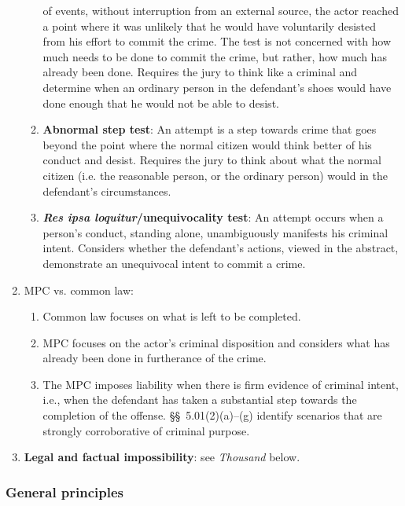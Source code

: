 \begin{enumerate}
\begin{enumerate}
        of events, without interruption from an external source, the actor 
        reached a point where it was unlikely that he would have voluntarily 
        desisted from his effort to commit the crime. The test is not 
        concerned with how much needs to be done to commit the crime, but 
        rather, how much has already been done. Requires the jury to think 
        like a criminal and determine when an ordinary person in the 
        defendant's shoes would have done enough that he would not be able to 
        desist.
        \item \textbf{Abnormal step test}: An attempt is a step towards crime 
        that goes beyond the point where the normal citizen would think better 
        of his conduct and desist.  Requires the jury to think about what the 
        normal citizen (i.e. the reasonable person, or the ordinary person) 
        would in the defendant's circumstances.
        \item \textbf{\emph{Res ipsa loquitur}/unequivocality test}:  An 
        attempt occurs when a person's conduct, standing alone, unambiguously 
        manifests his criminal intent.  Considers whether the defendant's 
        actions, viewed in the abstract, demonstrate an unequivocal intent to 
        commit a crime.
    \end{enumerate}
    \item MPC vs. common law:
    \begin{enumerate}
        \item Common law focuses on what is left to be completed.
        \item MPC focuses on the actor's criminal disposition and considers 
        what has already been done in furtherance of the crime.
        \item The MPC imposes liability when there is firm evidence of 
        criminal intent, i.e., when the defendant has taken a substantial step 
        towards the completion of the offense. \S\S\ 5.01(2)(a)--(g) identify 
        scenarios that are strongly corroborative of criminal purpose.
    \end{enumerate}
    \item \textbf{Legal and factual impossibility}: see \emph{Thousand} below.
\end{enumerate}

\subsubsection{General principles}

